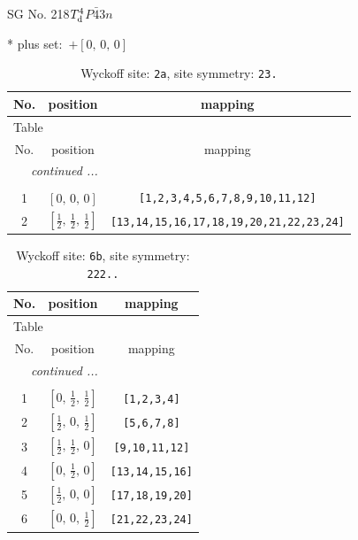\documentclass[fleqn,8pt]{jsarticle}
\begin{document}
\setcounter{MaxMatrixCols}{32}

\renewcommand{\tablename}{Table~}
\renewcommand{\figurename}{Figure~}
\begin{center}
\LARGE
SG No. 218\quad$T_{\rm d}^{4}$\quad$P\bar{4}3n$\quad[ cubic ]
\end{center}
* plus set:\,\,\,$+\left[ 0,\, 0,\, 0 \right]$
\renewcommand{\arraystretch}{1.2}
\begin{longtable}{ccc}
\caption{Wyckoff site: {\tt 2a}, site symmetry: {\tt 23.}}
 \\
 \hline \hline
No. & position & mapping \\ \hline \endfirsthead

\multicolumn{2}{l}{\tablename\ \thetable{}} \\
 \hline \hline
No. & position & mapping \\ \hline \endhead

 \hline \hline
\multicolumn{2}{r}{\footnotesize\it continued ...} \\ \endfoot

 \hline \hline
\multicolumn{2}{r}{} \\ \endlastfoot

1 & $\left[ 0,\, 0,\, 0 \right]$ & {\tt [1,2,3,4,5,6,7,8,9,10,11,12]} \\ \hline
2 & $\left[ \frac{1}{2},\, \frac{1}{2},\, \frac{1}{2} \right]$ & {\tt [13,14,15,16,17,18,19,20,21,22,23,24]} \\
\end{longtable}
\renewcommand{\arraystretch}{1.2}
\begin{longtable}{ccc}
\caption{Wyckoff site: {\tt 6b}, site symmetry: {\tt 222..}}
 \\
 \hline \hline
No. & position & mapping \\ \hline \endfirsthead

\multicolumn{2}{l}{\tablename\ \thetable{}} \\
 \hline \hline
No. & position & mapping \\ \hline \endhead

 \hline \hline
\multicolumn{2}{r}{\footnotesize\it continued ...} \\ \endfoot

 \hline \hline
\multicolumn{2}{r}{} \\ \endlastfoot

1 & $\left[ 0,\, \frac{1}{2},\, \frac{1}{2} \right]$ & {\tt [1,2,3,4]} \\ \hline
2 & $\left[ \frac{1}{2},\, 0,\, \frac{1}{2} \right]$ & {\tt [5,6,7,8]} \\ \hline
3 & $\left[ \frac{1}{2},\, \frac{1}{2},\, 0 \right]$ & {\tt [9,10,11,12]} \\ \hline
4 & $\left[ 0,\, \frac{1}{2},\, 0 \right]$ & {\tt [13,14,15,16]} \\ \hline
5 & $\left[ \frac{1}{2},\, 0,\, 0 \right]$ & {\tt [17,18,19,20]} \\ \hline
6 & $\left[ 0,\, 0,\, \frac{1}{2} \right]$ & {\tt [21,22,23,24]} \\
\end{longtable}
\end{document}
